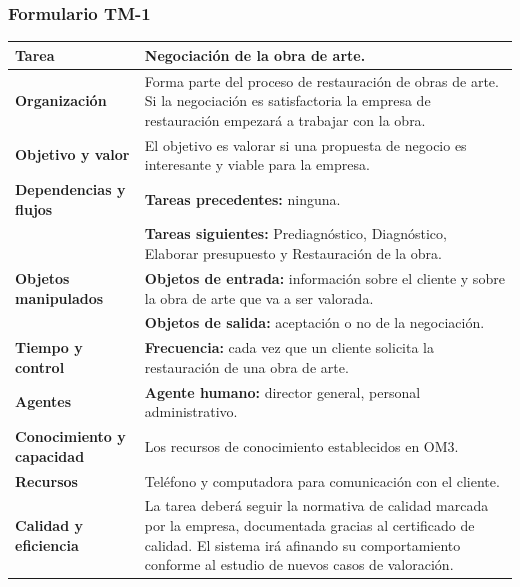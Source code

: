 \documentclass[a4paper,11pt]{article}
\begin{document}
			\subsubsection{Formulario TM-1}
			\begin{center}
				\begin{tabular}{| l | p{6.5cm} |}
					\hline
					\textbf{Tarea} & Negociación de la obra de arte.\\
					\hline
					\textbf{Organización} & Forma parte del proceso de restauración de obras de
					arte. Si la negociación es satisfactoria la empresa de restauración empezará a trabajar con la obra.\\
					\hline
					\textbf{Objetivo y valor} & El objetivo es valorar si una propuesta de
					negocio es interesante y viable para la empresa.\\
					\hline
					\textbf{Dependencias y flujos} & \textbf{Tareas precedentes:} ninguna.\\
					& \textbf{Tareas siguientes:} Prediagnóstico, Diagnóstico, Elaborar
					presupuesto y Restauración de la obra.\\
					\hline
					\textbf{Objetos manipulados} & \textbf{Objetos de entrada:} información
					sobre el cliente y sobre la obra de arte que va a ser valorada.\\
					& \textbf{Objetos de salida:} aceptación o no de la negociación.\\
					\hline
					\textbf{Tiempo y control} & \textbf{Frecuencia:} cada vez que un cliente
					solicita la restauración de una obra de arte.\\
					\hline
					\textbf{Agentes} & \textbf{Agente humano:} director general, personal
					administrativo.\\
					\hline
					\textbf{Conocimiento y capacidad} & Los recursos de conocimiento
					establecidos en OM3.\\
					\hline
					\textbf{Recursos} & Teléfono y computadora para comunicación con el
					cliente.\\
					\hline
					\textbf{Calidad y eficiencia} & La tarea deberá seguir la normativa de
					calidad marcada por la empresa, documentada gracias al certificado de
					calidad. El sistema irá afinando su comportamiento conforme al estudio de
					nuevos casos de valoración.\\
					\hline
				\end{tabular}
			\end{center}
			\newpage
\end{document}
